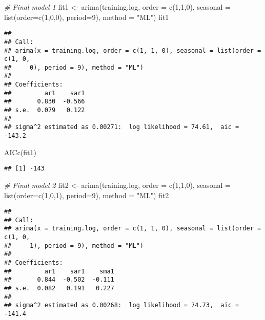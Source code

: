 \documentclass[
]{article}
\newenvironment{Shaded}{\begin{snugshade}}{\end{snugshade}}
\newcommand{\AttributeTok}[1]{\textcolor[rgb]{0.77,0.63,0.00}{#1}}
\newcommand{\CommentTok}[1]{\textcolor[rgb]{0.56,0.35,0.01}{\textit{#1}}}
\newcommand{\DecValTok}[1]{\textcolor[rgb]{0.00,0.00,0.81}{#1}}
\newcommand{\FunctionTok}[1]{\textcolor[rgb]{0.00,0.00,0.00}{#1}}
\newcommand{\NormalTok}[1]{#1}
\newcommand{\OtherTok}[1]{\textcolor[rgb]{0.56,0.35,0.01}{#1}}
\newcommand{\StringTok}[1]{\textcolor[rgb]{0.31,0.60,0.02}{#1}}
\begin{document}
\begin{Shaded}
\begin{Highlighting}[]
\CommentTok{\# Final model 1}
\NormalTok{fit1 }\OtherTok{\textless{}{-}} \FunctionTok{arima}\NormalTok{(training.log, }\AttributeTok{order =} \FunctionTok{c}\NormalTok{(}\DecValTok{1}\NormalTok{,}\DecValTok{1}\NormalTok{,}\DecValTok{0}\NormalTok{), }\AttributeTok{seasonal =}  \FunctionTok{list}\NormalTok{(}\AttributeTok{order=}\FunctionTok{c}\NormalTok{(}\DecValTok{1}\NormalTok{,}\DecValTok{0}\NormalTok{,}\DecValTok{0}\NormalTok{), }\AttributeTok{period=}\DecValTok{9}\NormalTok{), }\AttributeTok{method =} \StringTok{"ML"}\NormalTok{)}
\NormalTok{fit1}
\end{Highlighting}
\end{Shaded}

\begin{verbatim}
## 
## Call:
## arima(x = training.log, order = c(1, 1, 0), seasonal = list(order = c(1, 0, 
##     0), period = 9), method = "ML")
## 
## Coefficients:
##         ar1    sar1
##       0.830  -0.566
## s.e.  0.079   0.122
## 
## sigma^2 estimated as 0.00271:  log likelihood = 74.61,  aic = -143.2
\end{verbatim}

\begin{Shaded}
\begin{Highlighting}[]
\FunctionTok{AICc}\NormalTok{(fit1)}
\end{Highlighting}
\end{Shaded}

\begin{verbatim}
## [1] -143
\end{verbatim}

\begin{Shaded}
\begin{Highlighting}[]
\CommentTok{\# Final model 2}
\NormalTok{fit2 }\OtherTok{\textless{}{-}} \FunctionTok{arima}\NormalTok{(training.log, }\AttributeTok{order =} \FunctionTok{c}\NormalTok{(}\DecValTok{1}\NormalTok{,}\DecValTok{1}\NormalTok{,}\DecValTok{0}\NormalTok{), }\AttributeTok{seasonal =}  \FunctionTok{list}\NormalTok{(}\AttributeTok{order=}\FunctionTok{c}\NormalTok{(}\DecValTok{1}\NormalTok{,}\DecValTok{0}\NormalTok{,}\DecValTok{1}\NormalTok{), }\AttributeTok{period=}\DecValTok{9}\NormalTok{), }\AttributeTok{method =} \StringTok{"ML"}\NormalTok{)}
\NormalTok{fit2}
\end{Highlighting}
\end{Shaded}

\begin{verbatim}
## 
## Call:
## arima(x = training.log, order = c(1, 1, 0), seasonal = list(order = c(1, 0, 
##     1), period = 9), method = "ML")
## 
## Coefficients:
##         ar1    sar1    sma1
##       0.844  -0.502  -0.111
## s.e.  0.082   0.191   0.227
## 
## sigma^2 estimated as 0.00268:  log likelihood = 74.73,  aic = -141.4
\end{verbatim}
\end{document}
